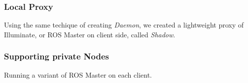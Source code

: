 \subsubsection{Local Proxy}
Using the same techique of creating \emph{Daemon}, we created a lightweight proxy of Illuminate, or ROS Master on client side, called \emph{Shadow}.

\subsubsection{Supporting private Nodes}
Running a variant of ROS Master on each client.


